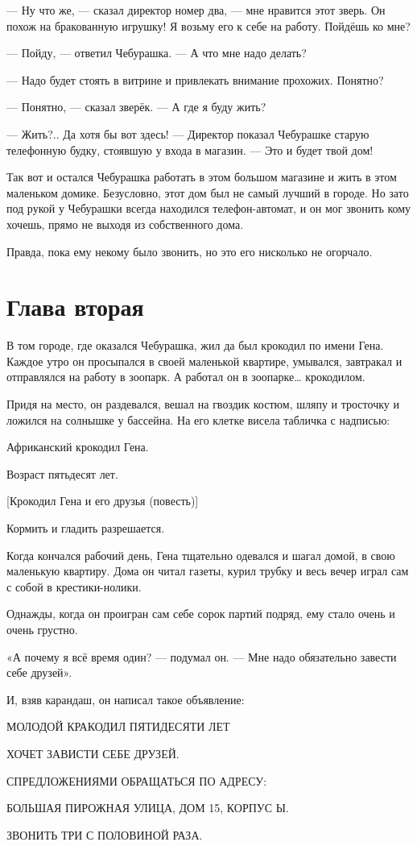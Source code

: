 — Ну что же, — сказал директор номер два, — мне нравится этот зверь. Он похож на бракованную игрушку! Я возьму его к себе на работу. Пойдёшь ко мне?

— Пойду, — ответил Чебурашка. — А что мне надо делать?

— Надо будет стоять в витрине и привлекать внимание прохожих. Понятно?

— Понятно, — сказал зверёк. — А где я буду жить?

— Жить?.. Да хотя бы вот здесь! — Директор показал Чебурашке старую телефонную будку, стоявшую у входа в магазин. — Это и будет твой дом!

Так вот и остался Чебурашка работать в этом большом магазине и жить в этом маленьком домике. Безусловно, этот дом был не самый лучший в городе. Но зато под рукой у Чебурашки всегда находился телефон-автомат, и он мог звонить кому хочешь, прямо не выходя из собственного дома.

Правда, пока ему некому было звонить, но это его нисколько не огорчало.

\section{Глава вторая}

В том городе, где оказался Чебурашка, жил да был крокодил по имени Гена. Каждое утро он просыпался в своей маленькой квартире, умывался, завтракал и отправлялся на работу в зоопарк. А работал он в зоопарке… крокодилом.

Придя на место, он раздевался, вешал на гвоздик костюм, шляпу и тросточку и ложился на солнышке у бассейна. На его клетке висела табличка с надписью:

Африканский крокодил Гена.

Возраст пятьдесят лет.

[Крокодил Гена и его друзья (повесть)]

Кормить и гладить разрешается.

Когда кончался рабочий день, Гена тщательно одевался и шагал домой, в свою маленькую квартиру. Дома он читал газеты, курил трубку и весь вечер играл сам с собой в крестики-нолики.

Однажды, когда он проигран сам себе сорок партий подряд, ему стало очень и очень грустно.

«А почему я всё время один? — подумал он. — Мне надо обязательно завести себе друзей».

И, взяв карандаш, он написал такое объявление:

МОЛОДОЙ КРАКОДИЛ ПЯТИДЕСЯТИ ЛЕТ

ХОЧЕТ ЗАВИСТИ СЕБЕ ДРУЗЕЙ.

СПРЕДЛОЖЕНИЯМИ ОБРАЩАТЬСЯ ПО АДРЕСУ:

БОЛЬШАЯ ПИРОЖНАЯ УЛИЦА, ДОМ 15, КОРПУС Ы.

ЗВОНИТЬ ТРИ С ПОЛОВИНОЙ РАЗА.

